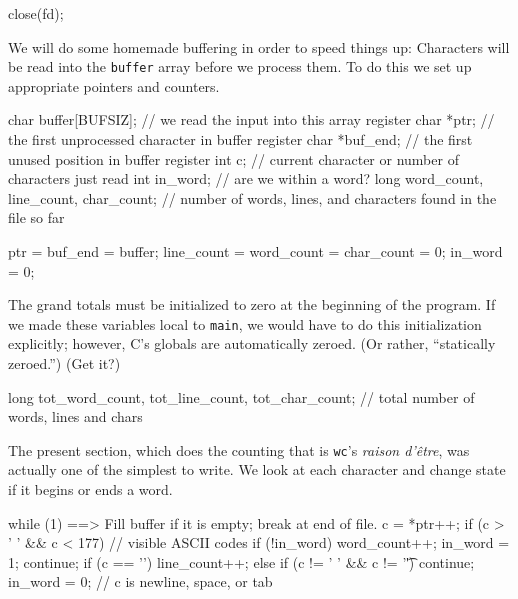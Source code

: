 \documentclass[11pt,a4paper]{article}
\begin{document}
\begin{code}[name={Close file}]
close(fd);
\end{code}

We will do some homemade buffering in order to speed things up: Characters will be read into the
\texttt{buffer} array before we process them. To do this we set up appropriate pointers and counters.

\begin{code}[name={Variables local to main}]
char buffer[BUFSIZ];     // we read the input into this array
register char *ptr;      // the first unprocessed character in buffer
register char *buf_end;  // the first unused position in buffer
register int c;          // current character or number of characters just read
int in_word;             // are we within a word?
long word_count, line_count, char_count; // number of words, lines, and characters found in the file so far
\end{code}

\begin{code}[name={Initialize pointers and counters}]
ptr = buf_end = buffer;
line_count = word_count = char_count = 0;
in_word = 0;
\end{code}

The grand totals must be initialized to zero at the beginning of the program. If we made these
variables local to \texttt{main}, we would have to do this initialization explicitly; however, C's
globals are automatically zeroed. (Or rather, ``statically zeroed.'') (Get it?)

\begin{code}[name={Global variables}]
long tot_word_count, tot_line_count, tot_char_count; // total number of words, lines and chars
\end{code}

The present section, which does the counting that is \texttt{wc}'s \emph{raison d'\^{e}tre}, was
actually one of the simplest to write. We look at each character and change state if it begins or
ends a word.

\begin{code}[name={Scan file}]
while (1) {
    ==> Fill buffer if it is empty; break at end of file.
    c = *ptr++;
    if (c > ' ' && c < 177) {    // visible ASCII codes
        if (!in_word) {
            word_count++;
            in_word = 1;
        }
        continue;
    }
    if (c == '\n') line_count++;
    else if (c != ' ' && c != '\t') continue;
    in_word = 0;  // c is newline, space, or tab
}
\end{code}
\end{document}
